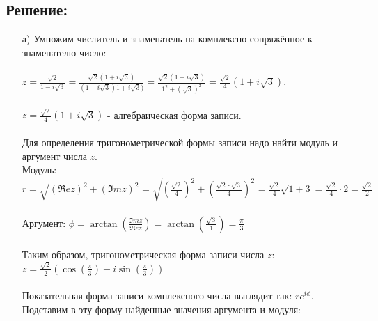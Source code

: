 \documentclass[12pt, a4paper]{article}
\begin{document}
    \subsection*{Решение:}
    \begin{enumerate}
        \item [а)] 
        Умножим числитель и знаменатель на комплексно-сопряжённое 
        к знаменателю число:\\\\
        \begin{math}
            z = \frac{\sqrt{2}}{1 - i\sqrt{3}} =
             \frac{\sqrt{2}(1 + i\sqrt{3})}{(1 - i\sqrt{3})1 + i\sqrt{3})} =
             \frac{\sqrt{2}(1 + i\sqrt{3})}{1^2 + (\sqrt{3})^2} =
             \frac{\sqrt{2}}{4}(1 + i\sqrt{3}).
        \end{math}
        \\\\
        \begin{math}
            z = \frac{\sqrt{2}}{4}(1 + i\sqrt{3})
        \end{math}
        - алгебраическая форма записи.\\\\
        Для определения тригонометрической формы записи 
        надо найти модуль и аргумент числа $z$.\\
        Модуль:
        \begin{math}
            r = \sqrt{(\Re ez)^2 + (\Im mz)^2} = 
            \sqrt{(\frac{\sqrt{2}}{4})^2 + (\frac{\sqrt{2}\cdot\sqrt{3}}{4})^2} = 
            \frac{\sqrt{2}}{4}\sqrt{1 + 3} = 
            \frac{\sqrt{2}}{4}\cdot 2 =
            \frac{\sqrt{2}}{2}
        \end{math}
        \\\\
        Аргумент:
        \begin{math}
            \phi = \arctan(\frac{\Im mz}{\Re ez}) = 
            \arctan(\frac{\sqrt{3}}{1}) = 
            \frac{\pi}{3}
        \end{math}
        \\\\
        Таким образом, тригонометрическая форма записи числа $z$:\\
        $z = \frac{\sqrt{2}}{2}(\cos(\frac{\pi}{3}) + i\sin(\frac{\pi}{3}))$
        \\\\
        Показательная форма записи комплексного числа выглядит так: 
        $re^{i\phi}$.  Подставим в эту форму найденные значения аргумента и модуля:

\end{enumerate}
\end{document}
